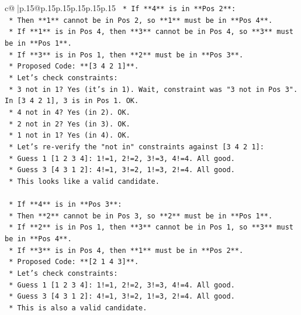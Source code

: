 \documentclass{article}
\begin{document}
{\begin{supertabular}{c@{$\;$}|p{.15\linewidth}@{}p{.15\linewidth}p{.15\linewidth}p{.15\linewidth}p{.15\linewidth}p{.15\linewidth}}
{{{\texttt{    *   If **4** is in **Pos 2**:} \\
\texttt{        *   Then **1** cannot be in Pos 2, so **1** must be in **Pos 4**.} \\
\texttt{        *   If **1** is in Pos 4, then **3** cannot be in Pos 4, so **3** must be in **Pos 1**.} \\
\texttt{        *   If **3** is in Pos 1, then **2** must be in **Pos 3**.} \\
\texttt{        *   Proposed Code: **{[}3 4 2 1{]}**.} \\
\texttt{        *   Let's check constraints:} \\
\texttt{            *   3 not in 1? Yes (it's in 1). Wait, constraint was "3 not in Pos 3". In {[}3 4 2 1{]}, 3 is in Pos 1. OK.} \\
\texttt{            *   4 not in 4? Yes (in 2). OK.} \\
\texttt{            *   2 not in 2? Yes (in 3). OK.} \\
\texttt{            *   1 not in 1? Yes (in 4). OK.} \\
\texttt{        *   Let's re{-}verify the "not in" constraints against {[}3 4 2 1{]}:} \\
\texttt{            *   Guess 1 {[}1 2 3 4{]}: 1!=1, 2!=2, 3!=3, 4!=4. All good.} \\
\texttt{            *   Guess 3 {[}4 3 1 2{]}: 4!=1, 3!=2, 1!=3, 2!=4. All good.} \\
\texttt{        *   This looks like a valid candidate.} \\
\\ 
\texttt{    *   If **4** is in **Pos 3**:} \\
\texttt{        *   Then **2** cannot be in Pos 3, so **2** must be in **Pos 1**.} \\
\texttt{        *   If **2** is in Pos 1, then **3** cannot be in Pos 1, so **3** must be in **Pos 4**.} \\
\texttt{        *   If **3** is in Pos 4, then **1** must be in **Pos 2**.} \\
\texttt{        *   Proposed Code: **{[}2 1 4 3{]}**.} \\
\texttt{        *   Let's check constraints:} \\
\texttt{            *   Guess 1 {[}1 2 3 4{]}: 1!=1, 2!=2, 3!=3, 4!=4. All good.} \\
\texttt{            *   Guess 3 {[}4 3 1 2{]}: 4!=1, 3!=2, 1!=3, 2!=4. All good.} \\
\texttt{        *   This is also a valid candidate.} \\
}}}
\end{supertabular}}
\end{document}
